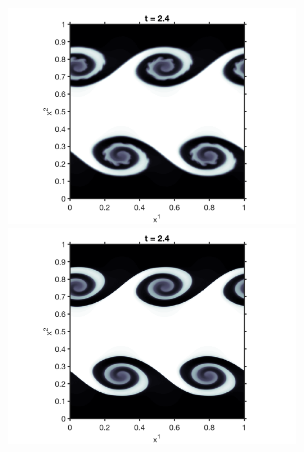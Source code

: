 \documentclass[letterpaper]{jpconf}
\begin{document}
\begin{figure}[h]
\begin{minipage}{18pc}
    \includegraphics[width=18pc]{./Figures/KelvinHelmholtz_24_Astronum_2018}
  \end{minipage}\hspace{0.5pc}
  \begin{minipage}{18pc}
    \includegraphics[width=18pc]{./Figures/KelvinHelmholtz_24_noLim_Astronum_2018}
  \end{minipage} \\
  \begin{minipage}{18pc}

\end{minipage}
\end{figure}
\end{document}
